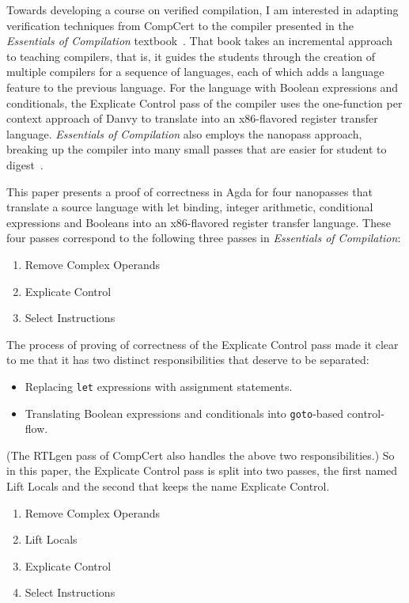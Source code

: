 \documentclass[sigplan,review,dvipsnames,screen,10pt]{acmart}
\begin{document}
Towards developing a course on verified compilation, I am interested
in adapting verification techniques from CompCert to the compiler
presented in the \emph{Essentials of Compilation}
textbook~\citep{Siek:2023tr,Siek:2023ue}. That book takes an
incremental approach to teaching compilers, that is, it guides the
students through the creation of multiple compilers for a sequence of
languages, each of which adds a language feature to the previous
language. For the language with Boolean expressions and conditionals,
the Explicate Control pass of the compiler uses the one-function per
context approach of Danvy to translate into an x86-flavored register
transfer language.  \emph{Essentials of Compilation} also employs the
nanopass approach, breaking up the compiler into many small passes
that are easier for student to digest~\citep{Sarkar:2004fk}.

This paper presents a proof of correctness in Agda for four nanopasses
that translate a source language with let binding, integer arithmetic,
conditional expressions and Booleans into an x86-flavored register
transfer language. These four passes correspond to the
following three passes in \emph{Essentials of Compilation}:
\begin{enumerate}
\item Remove Complex Operands
\item Explicate Control
\item Select Instructions
\end{enumerate}
The process of proving of correctness of the Explicate Control pass
made it clear to me that it has two distinct responsibilities that
deserve to be separated:
\begin{itemize}
\item Replacing \texttt{let} expressions with assignment statements.
\item Translating Boolean expressions and conditionals into
  \texttt{goto}-based control-flow.
\end{itemize}
(The RTLgen pass of CompCert also handles the above two
responsibilities.)  So in this paper, the Explicate Control pass is
split into two passes, the first named Lift Locals and the second that
keeps the name Explicate Control.
\begin{enumerate}
\item Remove Complex Operands
\item Lift Locals
\item Explicate Control
\item Select Instructions
\end{enumerate}
\end{document}
